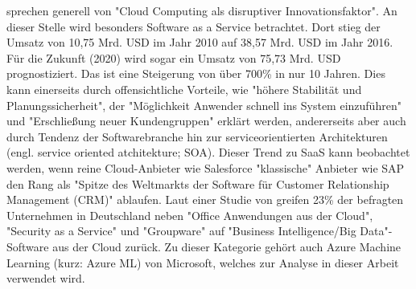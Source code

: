 \citep[S.~23]{appelrath_future_2014-1} sprechen generell von "Cloud Computing als disruptiver Innovationsfaktor". An dieser Stelle wird besonders Software as a Service betrachtet. Dort stieg der Umsatz von 10,75 Mrd. USD im Jahr 2010 auf 38,57 Mrd. USD im Jahr 2016. Für die Zukunft (2020) wird sogar ein Umsatz von 75,73 Mrd. USD prognostiziert.\citep{gartner_umsatz_2017} Das ist eine Steigerung von über 700\% in nur 10 Jahren. Dies kann einerseits durch offensichtliche Vorteile, wie "höhere Stabilität und Planungssicherheit", der "Möglichkeit Anwender schnell ins System einzuführen" und "Erschließung neuer Kundengruppen"\citep{fraunhofer_vorteile_2010} erklärt werden, andererseits aber auch durch Tendenz der Softwarebranche hin zur serviceorientierten Architekturen (engl. service oriented atchitekture; SOA).\citep[S.~22]{appelrath_future_2014-1} Dieser Trend zu SaaS kann beobachtet werden, wenn reine Cloud-Anbieter wie Salesforce "klassische" Anbieter wie SAP den Rang als "Spitze des Weltmarkts der Software für Customer Relationship Management (CRM)"\citep{fritsch_salesforce.com_2013} ablaufen.\newline
Laut einer Studie von \citep{bitkom_welche_2017} greifen 23\% der befragten Unternehmen in Deutschland neben "Office Anwendungen aus der Cloud", "Security as a Service" und "Groupware" auf "Business Intelligence/Big Data"-Software aus der Cloud zurück. Zu dieser Kategorie gehört auch Azure Machine Learning (kurz: Azure ML) von Microsoft, welches zur Analyse in dieser Arbeit verwendet wird.